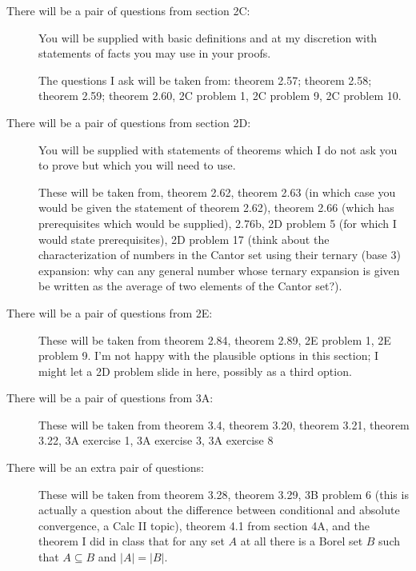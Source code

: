 \documentclass[12pt]{article}
\begin{document}
\begin{description}

\item[There will be a pair of questions from section 2C:]    You will be supplied with basic definitions and at my discretion with statements of facts you may use in your proofs.

The questions I ask will be taken from:  theorem 2.57; theorem 2.58; theorem 2.59; theorem 2.60, 2C problem 1, 2C problem 9, 2C problem 10.

\item[There will be a pair of questions from section 2D:]  You will be supplied with statements of theorems which I do not ask you to prove but which you will need to use.

These will be taken from, theorem 2.62, theorem 2.63 (in which case you would be given the statement of theorem 2.62), theorem 2.66 (which has prerequisites which would be supplied), 2.76b, 2D problem 5 (for which I would state prerequisites), 2D problem 17 (think about the characterization of numbers in the Cantor set using their ternary (base 3) expansion:  why can any general number whose ternary expansion is given be written as the average of two elements of the Cantor set?).

\item[There will be a pair of questions from 2E:]  These will be taken from theorem 2.84,  theorem 2.89,  2E problem 1, 2E problem 9.  I'm not happy with the plausible options in this section;  I might let a 2D problem slide in here, possibly as a third option.

\item[There will be a pair of questions from 3A:]   These will be taken from theorem 3.4, theorem 3.20, theorem 3.21, theorem 3.22, 3A exercise 1, 3A exercise 3, 3A exercise 8

\item[There will be an extra pair of questions:]  These will be taken from theorem 3.28, theorem 3.29, 3B problem 6 (this is actually a question about the difference between conditional and absolute convergence, a Calc II topic), theorem 4.1 from section 4A, and the theorem I did in class that for any set $A$ at all there is a Borel set $B$ such that $A \subseteq B$ and $|A|=|B|$.

\end{description}
\end{document}
